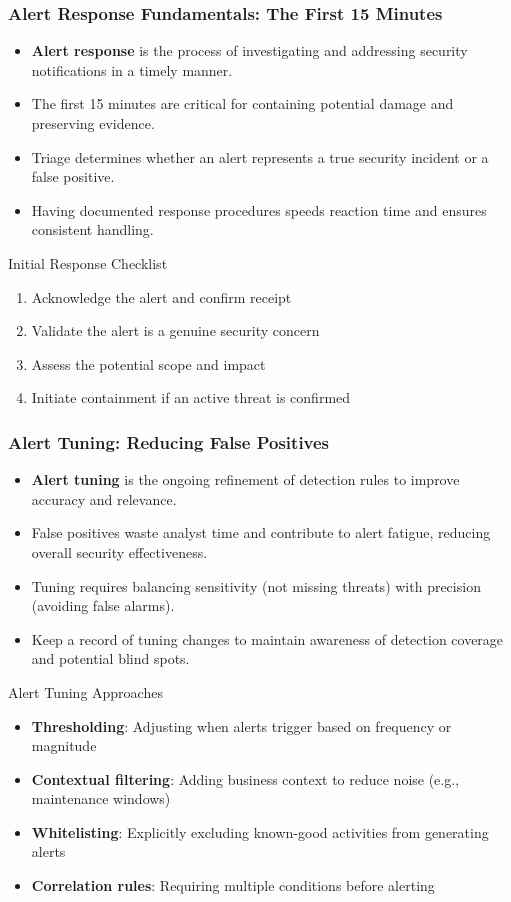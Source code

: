 \documentclass{beamer}
\begin{document}
\begin{frame}
\frametitle{Alert Response Fundamentals: The First 15 Minutes}
\begin{itemize}
\item \textbf{Alert response} is the process of investigating and addressing security notifications in a timely manner.
\item The first 15 minutes are critical for containing potential damage and preserving evidence.
\item Triage determines whether an alert represents a true security incident or a false positive.
\item Having documented response procedures speeds reaction time and ensures consistent handling.
\end{itemize}

\begin{alertblock}{Initial Response Checklist}
\scriptsize
\begin{enumerate}
\item Acknowledge the alert and confirm receipt
\item Validate the alert is a genuine security concern
\item Assess the potential scope and impact
\item Initiate containment if an active threat is confirmed
\end{enumerate}
\end{alertblock}
\end{frame}


\begin{frame}
\frametitle{Alert Tuning: Reducing False Positives}
\begin{itemize}
\item \textbf{Alert tuning} is the ongoing refinement of detection rules to improve accuracy and relevance.
\item False positives waste analyst time and contribute to alert fatigue, reducing overall security effectiveness.
\item Tuning requires balancing sensitivity (not missing threats) with precision (avoiding false alarms).
\item Keep a record of tuning changes to maintain awareness of detection coverage and potential blind spots.
\end{itemize}

\begin{block}{Alert Tuning Approaches}
\scriptsize
\begin{itemize}
\item \textbf{Thresholding}: Adjusting when alerts trigger based on frequency or magnitude
\item \textbf{Contextual filtering}: Adding business context to reduce noise (e.g., maintenance windows)
\item \textbf{Whitelisting}: Explicitly excluding known-good activities from generating alerts
\item \textbf{Correlation rules}: Requiring multiple conditions before alerting
\end{itemize}
\end{block}
\end{frame}
\end{document}
